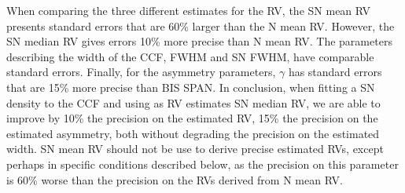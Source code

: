 \documentclass{aa}
\begin{document}
When comparing the three different estimates for the RV, the SN mean RV presents standard errors that are 60\% larger than the N mean RV. However, the SN median RV gives errors 10\% more precise than N mean RV. 
The parameters describing the width of the CCF, FWHM and SN FWHM, have comparable standard errors. 
Finally, for the asymmetry parameters, $\gamma$ has standard errors that are 15\% more precise than BIS SPAN. 
In conclusion, when fitting a SN density to the CCF and using as RV estimates SN median RV, we are able to improve by 10\% the precision on the estimated RV, 15\% the precision on the estimated asymmetry, both without degrading the precision on the estimated width. 
SN mean RV should not be use to derive precise estimated RVs, except perhaps in specific conditions described below, as the precision on this parameter is 60\% worse than the precision on the RVs derived from N mean RV.
%
\end{document}
